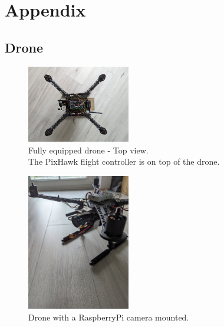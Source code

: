 \graphicspath{{./figures/}}
\chapter*{Appendix}
\renewcommand{\thesection}{\Alph{section}}

\section{Drone}
\label{sec:appendix_drone}
\begin{figure}[htbp]
    \centering
    \includegraphics[width=0.4\textwidth]{drone_fully_top.jpg}
    \caption[Fully equipped drone]{Fully equipped drone - Top view.\\
    The PixHawk flight controller is on top of the drone.}
\end{figure}

\begin{figure}[htbp]
    \centering
    \includegraphics[width=0.4\textwidth]{drone_cam.jpg}
    \caption[Drone with camera]{Drone with a RaspberryPi camera mounted.\\}
\end{figure}
\FloatBarrier
\newpage
